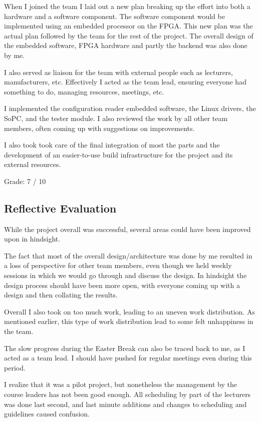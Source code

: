 When I joined the team I laid out a new plan breaking up the effort into both
a hardware and a software component. The software component would be implemented
using an embedded processor on the FPGA. This new plan was the actual plan followed
by the team for the rest of the project. The overall design of the embedded software,
FPGA hardware and partly the backend was also done by me.

I also served as liaison for the team with external people such as lecturers,
manufacturers, etc. Effectively I acted as the team lead, ensuring everyone
had something to do, managing resources, meetings, etc.

I implemented the configuration reader embedded software, the Linux drivers, the SoPC,
and the tester module. I also reviewed the work by all other team members,
often coming up with suggestions on improvements.

I also took took care of the final integration of most the parts and the development
of an easier-to-use build infrastructure for the project and its external resources.

Grade: 7 / 10





\subsection{Reflective Evaluation}
While the project overall was successful, several areas could have been improved
upon in hindsight.

The fact that most of the overall design/architecture was done by me resulted
in a loss of perspective for other team members, even though we held weekly sessions
in which we would go through and discuss the design. In hindsight the design
process should have been more open, with everyone coming up with a design and then
collating the results.

Overall I also took on too much work, leading to an uneven work distribution. As
mentioned earlier, this type of work distribution lead to some felt unhappiness in the
team.

The slow progress during the Easter Break can also be traced back to me, as I acted
as a team lead. I should have pushed for regular meetings even during this
period.

I realize that it was
a pilot project, but nonetheless the management by the course leaders has not been good enough. All
scheduling by part of the lecturers was done last second, and last minute additions
and changes to scheduling and guidelines caused confusion.

